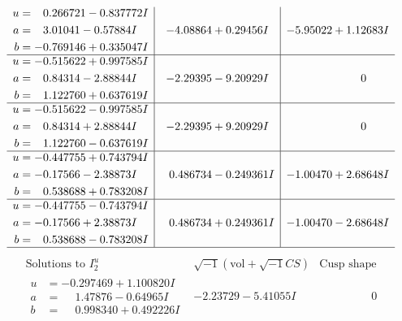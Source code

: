 \documentclass[1p]{elsarticle_modified}
\theoremstyle{definition}
\newcommand{\I}{\sqrt{-1}}
\begin{document}
$$\begin{array}{c|c|c}
\begin{aligned}
u &= \phantom{-}0.266721 - 0.837772 I \\
a &= \phantom{-}3.01041 - 0.57884 I \\
b &= -0.769146 + 0.335047 I\end{aligned}
 & -4.08864 + 0.29456 I & -5.95022 + 1.12683 I \\ \hline\begin{aligned}
u &= -0.515622 + 0.997585 I \\
a &= \phantom{-}0.84314 - 2.88844 I \\
b &= \phantom{-}1.122760 + 0.637619 I\end{aligned}
 & -2.29395 - 9.20929 I & \phantom{-0.000000 } 0 \\ \hline\begin{aligned}
u &= -0.515622 - 0.997585 I \\
a &= \phantom{-}0.84314 + 2.88844 I \\
b &= \phantom{-}1.122760 - 0.637619 I\end{aligned}
 & -2.29395 + 9.20929 I & \phantom{-0.000000 } 0 \\ \hline\begin{aligned}
u &= -0.447755 + 0.743794 I \\
a &= -0.17566 - 2.38873 I \\
b &= \phantom{-}0.538688 + 0.783208 I\end{aligned}
 & \phantom{-}0.486734 - 0.249361 I & -1.00470 + 2.68648 I \\ \hline\begin{aligned}
u &= -0.447755 - 0.743794 I \\
a &= -0.17566 + 2.38873 I \\
b &= \phantom{-}0.538688 - 0.783208 I\end{aligned}
 & \phantom{-}0.486734 + 0.249361 I & -1.00470 - 2.68648 I\\
 \hline 
 \end{array}$$\newpage$$\begin{array}{c|c|c}  
\text{Solutions to }I^u_{2}& \I (\text{vol} + \sqrt{-1}CS) & \text{Cusp shape}\\
 \hline 
\begin{aligned}
u &= -0.297469 + 1.100820 I \\
a &= \phantom{-}1.47876 - 0.64965 I \\
b &= \phantom{-}0.998340 + 0.492226 I\end{aligned}
 & -2.23729 - 5.41055 I & \phantom{-0.000000 } 0 \\ \hline\begin{aligned}

\end{aligned}
\end{array}$$
\end{document}
